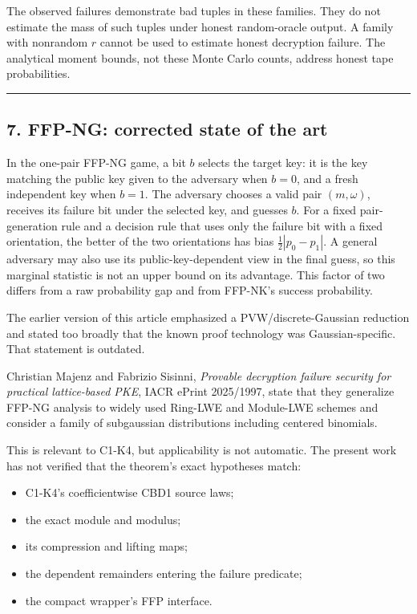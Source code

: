 \documentclass[11pt,a4paper]{article}
\providecommand{\tightlist}{\setlength{\itemsep}{0pt}\setlength{\parskip}{0pt}}
\begin{document}
The observed failures demonstrate bad tuples in these families. They do not estimate the mass of such tuples under honest random-oracle output. A family with nonrandom \(r\) cannot be used to estimate honest decryption failure. The analytical moment bounds, not these Monte Carlo counts, address honest tape probabilities.

\begin{center}\rule{0.5\linewidth}{0.5pt}\end{center}

\subsection{7. FFP-NG: corrected state of the art}\label{ffp-ng-corrected-state-of-the-art}

In the one-pair FFP-NG game, a bit \(b\) selects the target key: it is the key matching the public key given to the adversary when \(b=0\), and a fresh independent key when \(b=1\). The adversary chooses a valid pair \((m,\omega)\), receives its failure bit under the selected key, and guesses \(b\). For a fixed pair-generation rule and a decision rule that uses only the failure bit with a fixed orientation, the better of the two orientations has bias \(\tfrac12|p_0-p_1|\). A general adversary may also use its public-key-dependent view in the final guess, so this marginal statistic is not an upper bound on its advantage. This factor of two differs from a raw probability gap and from FFP-NK's success probability.

The earlier version of this article emphasized a PVW/discrete-Gaussian reduction and stated too broadly that the known proof technology was Gaussian-specific. That statement is outdated.

Christian Majenz and Fabrizio Sisinni, \emph{Provable decryption failure security for practical lattice-based PKE}, IACR ePrint 2025/1997, state that they generalize FFP-NG analysis to widely used Ring-LWE and Module-LWE schemes and consider a family of subgaussian distributions including centered binomials.

This is relevant to C1-K4, but applicability is not automatic. The present work has not verified that the theorem's exact hypotheses match:

\begin{itemize}
\tightlist
\item
  C1-K4's coefficientwise CBD1 source laws;
\item
  the exact module and modulus;
\item
  its compression and lifting maps;
\item
  the dependent remainders entering the failure predicate;
\item
  the compact wrapper's FFP interface.
\end{itemize}
\end{document}
